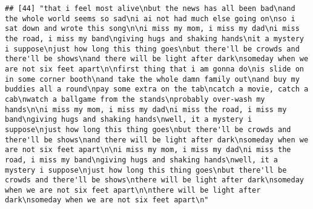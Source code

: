 \documentclass[]{article}
\begin{document}
\begin{verbatim}
## [44] "that i feel most alive\nbut the news has all been bad\nand the whole world seems so sad\ni ai not had much else going on\nso i sat down and wrote this song\n\ni miss my mom, i miss my dad\ni miss the road, i miss my band\ngiving hugs and shaking hands\nit a mystery i suppose\njust how long this thing goes\nbut there'll be crowds and there'll be shows\nand there will be light after dark\nsomeday when we are not six feet apart\n\nfirst thing that i am gonna do\nis slide on in some corner booth\nand take the whole damn family out\nand buy my buddies all a round\npay some extra on the tab\ncatch a movie, catch a cab\nwatch a ballgame from the stands\nprobably over-wash my hands\n\ni miss my mom, i miss my dad\ni miss the road, i miss my band\ngiving hugs and shaking hands\nwell, it a mystery i suppose\njust how long this thing goes\nbut there'll be crowds and there'll be shows\nand there will be light after dark\nsomeday when we are not six feet apart\n\ni miss my mom, i miss my dad\ni miss the road, i miss my band\ngiving hugs and shaking hands\nwell, it a mystery i suppose\njust how long this thing goes\nbut there'll be crowds and there'll be shows\nthere will be light after dark\nsomeday when we are not six feet apart\n\nthere will be light after dark\nsomeday when we are not six feet apart\n"                                                                                                                                                                                                                                                                                                                                                                                                                                                                                                                                                                                                                                                                                                                                                                                                                                                                                                                                                                                                                                                                                                                                                                                                                                                                                                                                                                                                                                                                                                                                                                                                                 

\end{verbatim}
\end{document}
